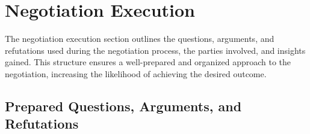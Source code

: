 \chapter{Negotiation Execution}\label{chap:negotiation_execution}

The negotiation execution section outlines the questions, arguments, and refutations used during the negotiation process, the parties involved, and insights gained. This structure ensures a well-prepared and organized approach to the negotiation, increasing the likelihood of achieving the desired outcome.


\section{Prepared Questions, Arguments, and Refutations}

